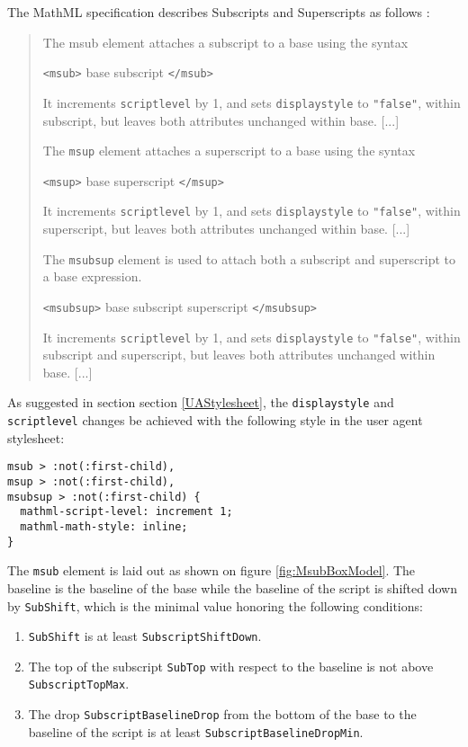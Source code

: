 The MathML specification describes Subscripts and Superscripts as
follows \cite{MathML3}:
%
\begin{quote}
The msub element attaches a subscript to a base using the syntax

  {\tt <msub>} base subscript {\tt </msub>}

It increments {\tt scriptlevel} by 1, and sets {\tt displaystyle} to
{\tt "false"}, within subscript, but leaves both attributes unchanged within
base. [...]

The {\tt msup} element attaches a superscript to a base using the syntax

  {\tt <msup>} base superscript {\tt </msup>}

It increments {\tt scriptlevel} by 1, and sets {\tt displaystyle} to
{\tt "false"}, within superscript, but leaves both attributes unchanged within
base. [...]

The {\tt msubsup} element is used to attach both a subscript and superscript to
a base expression.

  {\tt <msubsup>} base subscript superscript {\tt </msubsup>}

It increments {\tt scriptlevel} by 1, and sets {\tt displaystyle} to
{\tt "false"}, within subscript and superscript, but leaves both attributes
unchanged within base. [...]
\end{quote}
%

As suggested in section section \ref{UAStylesheet}, the {\tt displaystyle} and
{\tt scriptlevel} changes be achieved with the
following style in the user agent stylesheet:
%
\begin{lstlisting}
msub > :not(:first-child),
msup > :not(:first-child),
msubsup > :not(:first-child) {
  mathml-script-level: increment 1;
  mathml-math-style: inline;
}
\end{lstlisting}
%

The {\tt msub} element is laid out as shown on figure \ref{fig:MsubBoxModel}.
The baseline is the baseline of the base while the baseline of the script is
shifted down by {\tt SubShift}, which is the minimal value honoring the
following conditions:
\begin{enumerate}
\item {\tt SubShift} is at least {\tt SubscriptShiftDown}.
\item The top of the subscript {\tt SubTop} with respect to the baseline
  is not above {\tt SubscriptTopMax}.
\item The drop {\tt SubscriptBaselineDrop} from the bottom of the base to
  the baseline of the script is at least
  {\tt SubscriptBaselineDropMin}.
\end{enumerate}


